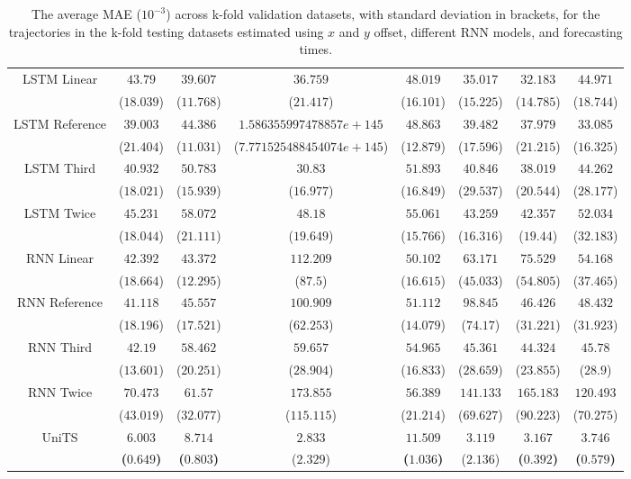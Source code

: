 \begin{table}[!ht]
{\begin{tabular}{|c|c|c|c|c|c|c|c|}
			\multirow{2}{*}{LSTM Linear} & $43.79$ & $39.607$ & $36.759$ & $48.019$ & $35.017$ & $32.183$ & $44.971$ \\
			 & ($18.039$) & ($11.768$) & ($21.417$) & ($16.101$) & ($15.225$) & ($14.785$) & ($18.744$) \\ \hline
			\multirow{2}{*}{LSTM Reference} & $39.003$ & $44.386$ & $1.586355997478857e+145$ & $48.863$ & $39.482$ & $37.979$ & $33.085$ \\
			 & ($21.404$) & ($11.031$) & ($7.771525488454074e+145$) & ($12.879$) & ($17.596$) & ($21.215$) & ($16.325$) \\ \hline
			\multirow{2}{*}{LSTM Third} & $40.932$ & $50.783$ & $30.83$ & $51.893$ & $40.846$ & $38.019$ & $44.262$ \\
			 & ($18.021$) & ($15.939$) & ($16.977$) & ($16.849$) & ($29.537$) & ($20.544$) & ($28.177$) \\ \hline
			\multirow{2}{*}{LSTM Twice} & $45.231$ & $58.072$ & $48.18$ & $55.061$ & $43.259$ & $42.357$ & $52.034$ \\
			 & ($18.044$) & ($21.111$) & ($19.649$) & ($15.766$) & ($16.316$) & ($19.44$) & ($32.183$) \\ \hline
			\multirow{2}{*}{RNN Linear} & $42.392$ & $43.372$ & $112.209$ & $50.102$ & $63.171$ & $75.529$ & $54.168$ \\
			 & ($18.664$) & ($12.295$) & ($87.5$) & ($16.615$) & ($45.033$) & ($54.805$) & ($37.465$) \\ \hline
			\multirow{2}{*}{RNN Reference} & $41.118$ & $45.557$ & $100.909$ & $51.112$ & $98.845$ & $46.426$ & $48.432$ \\
			 & ($18.196$) & ($17.521$) & ($62.253$) & ($14.079$) & ($74.17$) & ($31.221$) & ($31.923$) \\ \hline
			\multirow{2}{*}{RNN Third} & $42.19$ & $58.462$ & $59.657$ & $54.965$ & $45.361$ & $44.324$ & $45.78$ \\
			 & ($13.601$) & ($20.251$) & ($28.904$) & ($16.833$) & ($28.659$) & ($23.855$) & ($28.9$) \\ \hline
			\multirow{2}{*}{RNN Twice} & $70.473$ & $61.57$ & $173.855$ & $56.389$ & $141.133$ & $165.183$ & $120.493$ \\
			 & ($43.019$) & ($32.077$) & ($115.115$) & ($21.214$) & ($69.627$) & ($90.223$) & ($70.275$) \\ \hline
			\multirow{2}{*}{UniTS} & $\mathbf{6.003}$ & $\mathbf{8.714}$ & $2.833$ & $\mathbf{11.509}$ & $3.119$ & $\mathbf{3.167}$ & $\mathbf{3.746}$ \\
			 & \textbf{(}$\mathbf{0.649}$\textbf{)} & \textbf{(}$\mathbf{0.803}$\textbf{)} & ($2.329$) & \textbf{(}$\mathbf{1.036}$\textbf{)} & ($2.136$) & \textbf{(}$\mathbf{0.392}$\textbf{)} & \textbf{(}$\mathbf{0.579}$\textbf{)} \\ \hline
		\end{tabular}
	}
	\caption{The average MAE ($10^{-3}$) across k-fold validation datasets, with standard deviation in brackets, for the trajectories in the k-fold testing datasets estimated using $x$ and $y$ offset, different RNN models, and forecasting times.}
	\label{tab:all_no_abs_MAE}
\end{table}